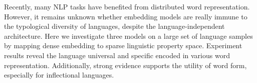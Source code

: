 Recently, many NLP tasks have benefited from distributed word representation. However, it remains unknown whether embedding models are really immune to the typological diversity of languages, despite the language-independent architecture. Here we investigate three models on a large set of language samples by mapping dense embedding to sparse linguistic property space. Experiment results reveal the language universal and specific encoded in various word representation. Additionally, strong evidence supports the utility of word form, especially for inflectional languages.
